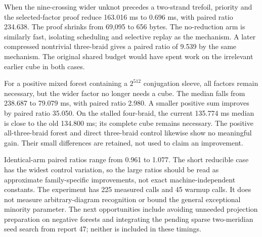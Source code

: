 When the nine-crossing wider unknot precedes a two-strand trefoil, priority
and the selected-factor proof reduce 163.016 ms to 0.696 ms, with paired ratio
234.638. The proof shrinks from 69,095 to 656 bytes. The no-reduction arm is
similarly fast, isolating scheduling and selective replay as the mechanism.
A later compressed nontrivial three-braid gives a paired ratio of 9.539 by
the same mechanism. The original shared budget would have spent work on the
irrelevant earlier cube in both cases.

For a positive mixed forest containing a $2^{512}$ conjugation sleeve, all
factors remain necessary, but the wider factor no longer needs a cube.
The median falls from 238.687 to 79.079 ms, with paired ratio 2.980.
A smaller positive sum improves by paired ratio 35.050. On the stalled
four-braid, the current 135.774 ms median is close to the old 134.800 ms;
its complete cube remains necessary. The positive all-three-braid forest
and direct three-braid control likewise show no meaningful gain. Their
small differences are retained, not used to claim an improvement.

Identical-arm paired ratios range from 0.961 to 1.077. The short reducible
case has the widest control variation, so the large ratios should be read
as approximate family-specific improvements, not exact machine-independent
constants. The experiment has 225 measured calls and 45 warmup calls.
It does not measure arbitrary-diagram recognition or bound the general
exceptional minority parameter. The next opportunities include avoiding
unneeded projection preparation on negative forests and integrating the
pending sparse two-meridian seed search from report 47; neither is included
in these timings.
